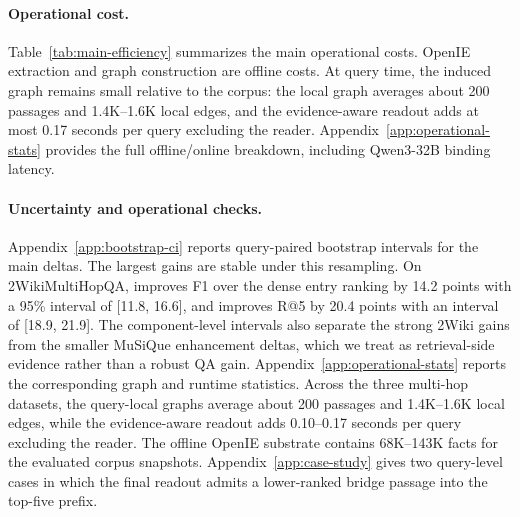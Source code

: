 \paragraph{Operational cost.}
Table~\ref{tab:main-efficiency} summarizes the main operational costs.
OpenIE extraction and graph construction are offline costs. At query
time, the induced graph remains small relative to the corpus: the
local graph averages about 200 passages and 1.4K--1.6K local edges, and
the evidence-aware readout adds at most 0.17 seconds per query
excluding the reader. Appendix~\ref{app:operational-stats} provides the
full offline/online breakdown, including Qwen3-32B binding latency.

\begin{table}[t]
\centering
\scriptsize
\setlength{\tabcolsep}{3pt}
\caption{Operational statistics for \methodname{} on the 1{,}000-query
multi-hop runs. Docs and facts describe the offline corpus substrate.
Local docs, local edges, flow iterations, and readout time are
query-time averages before the GPT-4o-mini reader.}
\label{tab:main-efficiency}
\end{table}

\paragraph{Uncertainty and operational checks.}
Appendix~\ref{app:bootstrap-ci} reports query-paired bootstrap
intervals for the main deltas. The largest gains are stable under this
resampling. On 2WikiMultiHopQA, \methodname{} improves F1 over the dense
entry ranking by 14.2 points with a 95\% interval of [11.8, 16.6], and
improves R@5 by 20.4 points with an interval of [18.9, 21.9]. The
component-level intervals also separate the strong 2Wiki gains from the
smaller MuSiQue enhancement deltas, which we treat as retrieval-side
evidence rather than a robust QA gain. Appendix~\ref{app:operational-stats}
reports the corresponding graph and runtime statistics. Across the
three multi-hop datasets, the query-local graphs average about 200
passages and 1.4K--1.6K local edges, while the evidence-aware readout
adds 0.10--0.17 seconds per query excluding the reader. The offline
OpenIE substrate contains 68K--143K facts for the evaluated corpus
snapshots. Appendix~\ref{app:case-study} gives two query-level cases in
which the final readout admits a lower-ranked bridge passage into the
top-five prefix.
